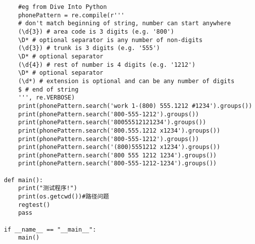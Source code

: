 \documentclass[twoside,11pt]{book}
\begin{document}
\begin{lstlisting}
    #eg from Dive Into Python
    phonePattern = re.compile(r'''
    # don't match beginning of string, number can start anywhere
    (\d{3}) # area code is 3 digits (e.g. '800')
    \D* # optional separator is any number of non-digits
    (\d{3}) # trunk is 3 digits (e.g. '555')
    \D* # optional separator
    (\d{4}) # rest of number is 4 digits (e.g. '1212')
    \D* # optional separator
    (\d*) # extension is optional and can be any number of digits
    $ # end of string
    ''', re.VERBOSE)
    print(phonePattern.search('work 1-(800) 555.1212 #1234').groups())
    print(phonePattern.search('800-555-1212').groups())
    print(phonePattern.search('80055512121234').groups())
    print(phonePattern.search('800.555.1212 x1234').groups())
    print(phonePattern.search('800-555-1212').groups())
    print(phonePattern.search('(800)5551212 x1234').groups())
    print(phonePattern.search('800 555 1212 1234').groups())
    print(phonePattern.search('800-555-1212-1234').groups())

def main():
    print("测试程序!")
    print(os.getcwd())#路径问题
    regtest()
    pass

if __name__ == "__main__":
    main()
\end{lstlisting}
\end{document}
